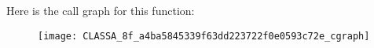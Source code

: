 Here is the call graph for this function\+:\nopagebreak
\begin{figure}[H]
\begin{center}
\leavevmode
\texttt{[image: CLASSA\_8f\_a4ba5845339f63dd223722f0e0593c72e\_cgraph]}
\end{center}
\end{figure}


